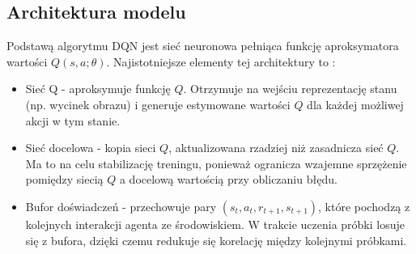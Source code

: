 \documentclass[a4paper, 12pt]{article}
\numberwithin{equation}{section}
\begin{document}
    \subsection{Architektura modelu}
    Podstawą algorytmu DQN jest sieć neuronowa pełniąca funkcję aproksymatora wartości \( Q(s,a;\theta) \). Najistotniejsze elementy tej architektury to \cite{mnih2015nature}:
    \begin{itemize}
        \item Sieć Q - aproksymuje funkcję \( Q \). Otrzymuje na wejściu reprezentację stanu (np. wycinek obrazu) i generuje estymowane wartości \( Q \) dla każdej możliwej akcji w tym stanie.
        \item Sieć docelowa - kopia sieci \( Q \), aktualizowana rzadziej niż zasadnicza sieć \( Q \). Ma to na celu stabilizację treningu, ponieważ ogranicza wzajemne sprzężenie pomiędzy siecią \( Q \) a docelową wartością przy obliczaniu błędu.
        \item Bufor doświadczeń - przechowuje pary \( ( s_t, a_t, r_{t+1}, s_{t+1}) \), które pochodzą z kolejnych interakcji agenta ze środowiskiem. W trakcie uczenia próbki losuje się z bufora, dzięki czemu redukuje się korelację między kolejnymi próbkami.
    \end{itemize}
\end{document}
